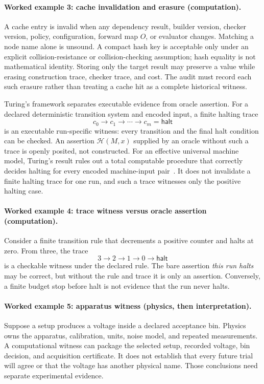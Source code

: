\paragraph{Worked example 3: cache invalidation and erasure (computation).}
A cache entry is invalid when any dependency result, builder version, checker version, policy, configuration,
forward map \(O\), or evaluator changes.  Matching a node name alone is unsound.  A compact hash key is acceptable only
under an explicit collision-resistance or collision-checking assumption; hash equality is not mathematical identity.
Storing only the target result may preserve a value while erasing construction trace, checker trace, and cost.  The
audit must record each such erasure rather than treating a cache hit as a complete historical witness.

Turing's framework separates executable evidence from oracle assertion.  For a declared deterministic transition
system and encoded input, a finite halting trace
\[
                c_0\to c_1\to\cdots\to c_m=\mathsf{halt}
\]
is an executable run-specific witness: every transition and the final halt condition can be checked.  An assertion
\(\mathcal H(M,x)\) supplied by an oracle without such a trace is openly posited, not constructed.  For an effective
universal machine model, Turing's result rules out a total computable procedure that correctly decides halting for
every encoded machine-input pair~\cite{turing1936}.  It does not invalidate a finite halting trace for one run, and
such a trace witnesses only the positive halting case.

\paragraph{Worked example 4: trace witness versus oracle assertion (computation).}
Consider a finite transition rule that decrements a positive counter and halts at zero.  From three, the trace
\[
                         3\to2\to1\to0\to\mathsf{halt}
\]
is a checkable witness under the declared rule.  The bare assertion \emph{this run halts} may be correct, but without
the rule and trace it is only an assertion.  Conversely, a finite budget stop before halt is not evidence that the run
never halts.

\paragraph{Worked example 5: apparatus witness (physics, then interpretation).}
Suppose a setup produces a voltage inside a declared acceptance bin.  Physics owns the apparatus, calibration, units,
noise model, and repeated measurements.  A computational witness can package the selected setup, recorded voltage, bin
decision, and acquisition certificate.  It does not establish that every future trial will agree or that the voltage
has another physical name.  Those conclusions need separate experimental evidence.

